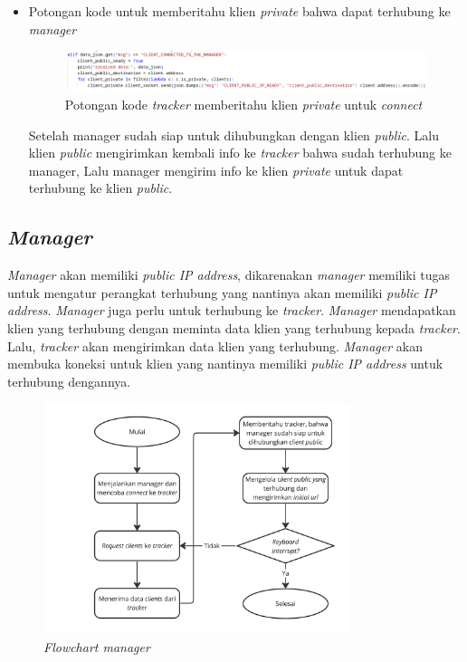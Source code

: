\begin{itemize}
	\item{Potongan kode untuk memberitahu klien \emph{private} bahwa dapat terhubung ke \emph{manager} }
	\begin{figure}[H]
		\centering{}
		\includegraphics[width=1\textwidth]{gambar/kode/potongan_tracker_04}
		\caption{Potongan kode \emph{tracker} memberitahu klien \emph{private} untuk \emph{connect}}
	\end{figure}
	Setelah manager sudah siap untuk dihubungkan dengan klien \emph{public}. Lalu klien \emph{public} mengirimkan kembali info ke \emph{tracker} bahwa sudah terhubung ke manager, Lalu manager mengirim info ke klien \emph{private} untuk dapat terhubung ke klien \emph{public}.

\end{itemize} 

\subsection{\emph{Manager}}
\emph{Manager} akan memiliki \emph{public IP address}, dikarenakan \emph{manager} memiliki tugas untuk mengatur perangkat terhubung yang nantinya akan memiliki \emph{public IP address}. \emph{Manager} juga perlu untuk terhubung ke \emph{tracker}. \emph{Manager} mendapatkan klien yang terhubung dengan meminta data klien yang terhubung kepada \emph{tracker}. Lalu, \emph{tracker} akan mengirimkan data klien yang terhubung. \emph{Manager} akan membuka koneksi untuk klien yang nantinya memiliki \emph{public IP address} untuk terhubung dengannya.

\begin{figure}[H]
	\centering{}
	\includegraphics[width=0.8\textwidth]{gambar/flowchart_manager}
	\caption{\emph{Flowchart manager} }
\end{figure}

